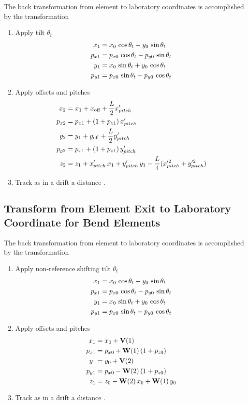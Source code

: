 The back transformation from element to laboratory coordinates is
accomplished by the transformation
\begin{enumerate}
\setlength{\itemsep}{0pt}
\item
Apply tilt $\theta_t$
\vspace{-1ex}
\begin{align}
  x_1    &=  x_0    \, \cos\theta_t - y_0    \, \sin\theta_t \nonumber \\
  p_{x1} &=  p_{x0} \, \cos\theta_t - p_{y0} \, \sin\theta_t \nonumber \\
  y_1    &=  x_0    \, \sin\theta_t + y_0    \, \cos\theta_t \\
  p_{y1} &=  p_{x0} \, \sin\theta_t + p_{y0} \, \cos\theta_t \nonumber
\end{align}
\item
Apply offsets and pitches
\vspace{-1ex}
\begin{align}
  x_2    &= x_1 + x_{\text{off}} + \frac{L}{2} x'_{pitch}     \nonumber \\
  p_{x2} &= p_{x1} + (1 + p_{z1}) \, x'_{pitch}        \nonumber \\
  y_2    &= y_1 + y_{\text{off}} + \frac{L}{2} y'_{pitch}     \\
  p_{y2} &= p_{x1} + (1 + p_{z1}) \, y'_{pitch}        \nonumber \\
  z_2    &= z_1 + x'_{pitch} \, x_1 + y'_{pitch} \, y_1 - 
    \frac{L}{4} (x^{\prime2}_{pitch} + y^{\prime2}_{pitch})      \nonumber
\end{align}
\item
Track as in a drift a distance .
\end{enumerate}

\subsection{Transform from Element Exit to Laboratory Coordinate for Bend Elements}

The back transformation from element to laboratory coordinates is
accomplished by the transformation
\begin{enumerate}
\setlength{\itemsep}{0pt}
\item
Apply non-reference shifting tilt $\theta_t$
\vspace{-1ex}
\begin{align}
  x_1    &=  x_0    \, \cos\theta_t - y_0    \, \sin\theta_t \nonumber \\
  p_{x1} &=  p_{x0} \, \cos\theta_t - p_{y0} \, \sin\theta_t \nonumber \\
  y_1    &=  x_0    \, \sin\theta_t + y_0    \, \cos\theta_t \\
  p_{y1} &=  p_{x0} \, \sin\theta_t + p_{y0} \, \cos\theta_t \nonumber
\end{align}
\item
Apply offsets and pitches
\vspace{-1ex}
\begin{align}
  x_1    &= x_0 + {\bf V}(1) \nonumber \\
  p_{x1} &= p_{x0} + {\bf W}(1) \, (1 + p_{z0}) \nonumber \\
  y_1    &= y_0 + {\bf V}(2) \\
  p_{y1} &= p_{x0} - {\bf W}(2) \, (1 + p_{z0}) \nonumber \\
  z_1    &= z_0 - {\bf W}(2) \, x_0 + {\bf W}(1) \, y_0 \nonumber
\end{align}
\item
Track as in a drift a distance .
\end{enumerate}

